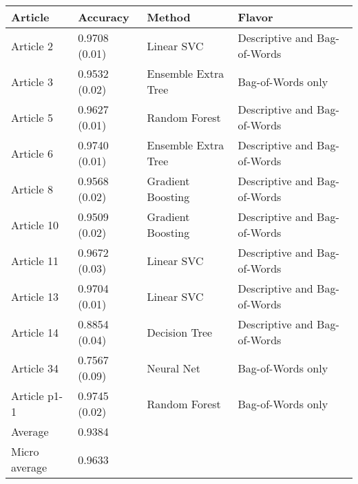 \begin{tabular}{|l|l|l|l| }
\hline
Article & Accuracy & Method & Flavor \\ \hline
Article 2 & 0.9708 (0.01) & Linear SVC & Descriptive and Bag-of-Words\\
Article 3 & 0.9532 (0.02) & Ensemble Extra Tree & Bag-of-Words only\\
Article 5 & 0.9627 (0.01) & Random Forest & Descriptive and Bag-of-Words\\
Article 6 & 0.9740 (0.01) & Ensemble Extra Tree & Descriptive and Bag-of-Words\\
Article 8 & 0.9568 (0.02) & Gradient Boosting & Descriptive and Bag-of-Words\\
Article 10 & 0.9509 (0.02) & Gradient Boosting & Descriptive and Bag-of-Words\\
Article 11 & 0.9672 (0.03) & Linear SVC & Descriptive and Bag-of-Words\\
Article 13 & 0.9704 (0.01) & Linear SVC & Descriptive and Bag-of-Words\\
Article 14 & 0.8854 (0.04) & Decision Tree & Descriptive and Bag-of-Words\\
Article 34 & 0.7567 (0.09) & Neural Net & Bag-of-Words only\\
Article p1-1 & 0.9745 (0.02) & Random Forest & Bag-of-Words only\\
Average & 0.9384 & & \\
Micro average & 0.9633 & & \\
\hline
\end{tabular}